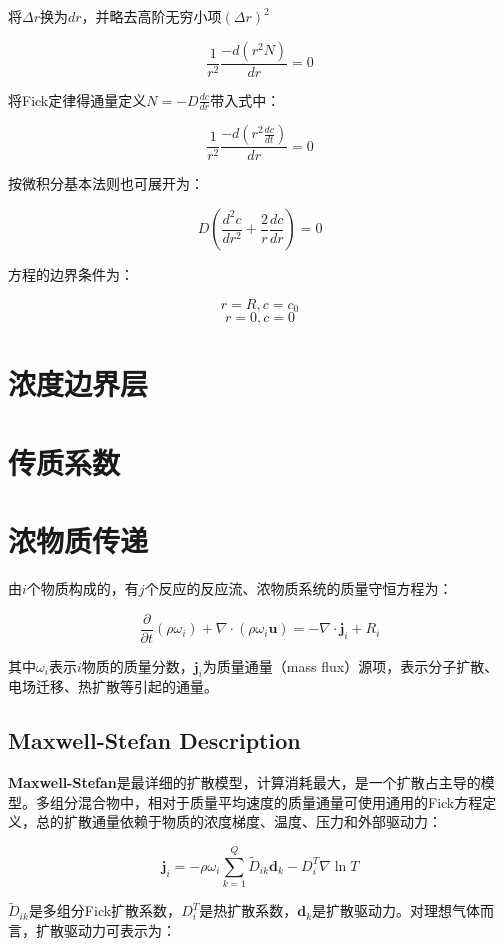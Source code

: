 将$ \Delta r $换为$ dr $，并略去高阶无穷小项$ (\Delta r)^2 $

\[ \frac{1}{r^2}\frac{-d\left(r^2 N\right)}{dr} = 0 \]

将Fick定律得通量定义$ N=-D\frac{dc}{dr} $带入式中：

\[ \boxed{\frac{1}{r^2}\frac{-d\left(r^2 \frac{dc}{dt}\right)}{dr} = 0} \]

按微积分基本法则也可展开为：

\[\boxed{D\left(\frac{d^2c}{dr^2} + \frac{2}{r} \frac{dc}{dr}\right) = 0}\]

方程的边界条件为：

\[ r=R, c=c_0 \]
\[ r=0, c=0 \]

\section{浓度边界层}

\section{传质系数}


\section{浓物质传递}
由$i$个物质构成的，有$j$个反应的反应流、浓物质系统的质量守恒方程为：

\begin{equation}
    \frac{\partial}{\partial t}(\rho\omega_i) + \nabla\cdot(\rho\omega_i\bm{u}) = -\nabla\cdot\bm{j}_i + R_i
\end{equation}

其中$\omega_i$表示$i$物质的质量分数，$\bm{j}_i$为质量通量（mass flux）源项，表示分子扩散、电场迁移、热扩散等引起的通量。

\subsection{Maxwell-Stefan Description}
\textbf{Maxwell-Stefan}是最详细的扩散模型，计算消耗最大，是一个扩散占主导的模型。多组分混合物中，相对于质量平均速度的质量通量可使用通用的Fick方程定义，总的扩散通量依赖于物质的浓度梯度、温度、压力和外部驱动力：

\begin{equation}
    \bm{j}_i = -\rho\omega_i\sum_{k=1}^{Q} \tilde{D}_{ik} \bm{d}_{k} - D_i^T\nabla\ln T
\end{equation}

$\tilde{D}_{ik}$是多组分Fick扩散系数，$D_i^T$是热扩散系数，$\bm{d}_k$是扩散驱动力。对理想气体而言，扩散驱动力可表示为：

